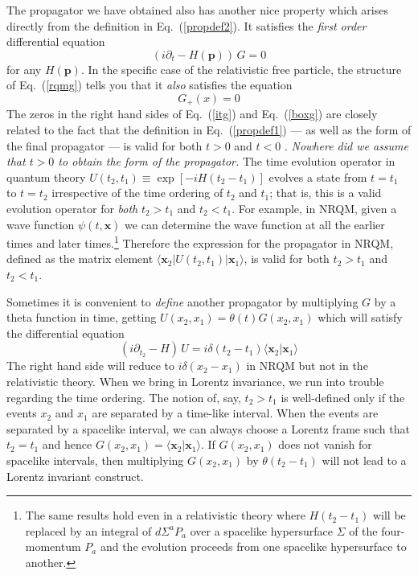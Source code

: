 \documentclass{article}
\def\eq#1{{Eq.~(\ref{#1})}}
\def\bk#1#2#3{{\langle #1|#2|#3\rangle}}  %
\def\amp#1#2{\langle #1 | #2\rangle}      %
\begin{document}
The propagator we have obtained also has another nice property which arises directly from the definition in \eq{propdef2}. It satisfies the \textit{first order} differential equation 
 \begin{equation}
 (i \partial_t - H(\bm {p}) )\, G =0
 \label{itg}
\end{equation} 
for any $H(\bm {p})$. In the specific case of the relativistic free particle, the structure of \eq{rqmg} tells you that it \textit{also} satisfies the equation
\begin{equation}
[\partial_a\partial^a + m^2] G_+(x)=0
\label{boxg}
\end{equation} 
The zeros in the right hand sides of \eq{itg} and \eq{boxg} are closely related to the fact that the definition in \eq{propdef1} --- as well as the form of the final propagator --- is valid for both $t>0$ and $t<0$ . \textit{Nowhere did we assume that $t>0$ to obtain the form of the propagator.} 
The time evolution operator in quantum theory 
 $U(t_2,t_1) \equiv \exp[-iH(t_2-t_1)]$ evolves a state from $t=t_1 $ to $t=t_2$ irrespective of the time ordering of $t_2$ and $t_1$; that is, this is a valid evolution operator for \textit{both} $t_2>t_1$ and $t_2<t_1$. For example, in NRQM, given a wave function $\psi(t,\bm{x})$ we can determine the wave function at all the earlier times and later times.\footnote{The same results hold even in a relativistic theory where $H(t_2-t_1)$ will be replaced by an integral of $d\Sigma^a P_a$ over a spacelike hypersurface $\Sigma$ of the four-momentum $P_a$ and the evolution proceeds from one spacelike hypersurface to another.}
 Therefore the expression for the  propagator in NRQM, defined as the matrix element $\bk{\bm{x}_2}{U(t_2,t_1)}{\bm{x}_1}$, is valid for both $t_2>t_1$ and $t_2<t_1$. 
 
 
Sometimes it is convenient to \textit{define} another propagator by multiplying $G$ by a theta function in time, getting $U(x_2,x_1)=\theta(t)G(x_2,x_1)$ which will satisfy the differential equation
 \begin{equation}
 (i \partial_{t_2} - H)\, U =i\delta(t_2-t_1)\amp{\bm{x}_2}{\bm{x}_1}
\end{equation}
The right hand side will reduce to $i\delta(x_2-x_1)$ in NRQM but not in the relativistic theory.
When we bring in Lorentz invariance, we run into trouble regarding the time ordering. The notion of, say, $t_2>t_1$ is well-defined only if the events $x_2$ and $x_1$ are separated by a time-like interval. When the events are separated by a spacelike interval, we can always choose a Lorentz frame such that $t_2 = t_1$ and hence $G(x_2,x_1) = \amp{\bm{x}_2}{\bm{x}_1}$. If  $G(x_2,x_1) $ does not vanish for spacelike intervals, then multiplying $G(x_2,x_1)$ by $\theta (t_2-t_1)$ will not lead to a Lorentz invariant construct. 
\end{document}

